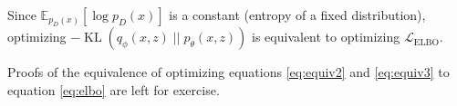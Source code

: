 \documentclass{article}
\newcommand{\kl}[2]{\operatorname{KL}({#1} \; || \; {#2})}
\begin{document}
Since $\mathbb{E}_{p_D(x)}[\log p_D(x)]$ is a constant (entropy of a fixed distribution), optimizing $-\kl{q_\phi(x, z)}{p_\theta(x, z)}$ is equivalent to optimizing $\mathcal{L}_\text{ELBO}$. 

Proofs of the equivalence of optimizing equations \ref{eq:equiv2} and \ref{eq:equiv3} to equation \ref{eq:elbo} are left for exercise.


\nocite{*}

\end{document}
